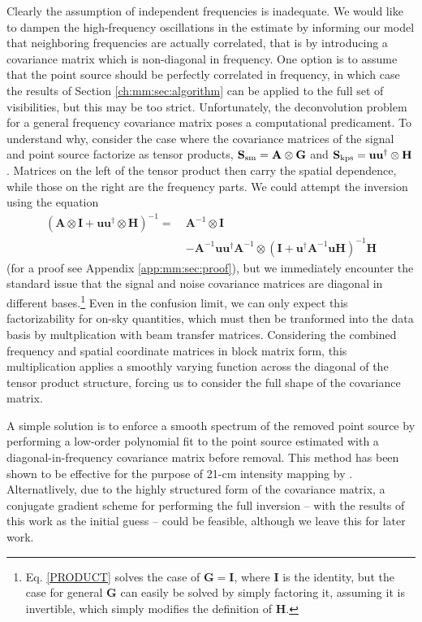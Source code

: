 Clearly the assumption of independent frequencies is inadequate. We would like to dampen the high-frequency oscillations in the estimate by informing our model that neighboring frequencies are actually correlated, that is by introducing a covariance matrix which is non-diagonal in frequency. One option is to assume that the point source should be perfectly correlated in frequency, in which case the results of Section \ref{ch:mm:sec:algorithm} can be applied to the full set of visibilities, but this may be too strict. Unfortunately, the deconvolution problem for a general frequency covariance matrix poses a computational predicament. To understand why, consider the case where the covariance matrices of the signal and point source factorize as tensor products, $\mathbf{S}_{\rm sm} = \mathbf{A} \otimes\mathbf{G}$ and $\mathbf{S}_{\rm kps} = \mathbf{u}\mathbf{u}^\dagger \otimes\mathbf{H}$. Matrices on the left of the tensor product then carry the spatial dependence, while those on the right are the frequency parts. We could attempt the inversion using the equation
\begin{align}
\left(\mathbf{A} \otimes \mathbf{I} + \mathbf{u}\mathbf{u}^\dagger \otimes \mathbf{H} \right)^{-1} = ~& \mathbf{A}^{-1} \otimes \mathbf{I} \label{PRODUCT}
\\ &- \mathbf{A}^{-1}\mathbf{u}\mathbf{u}^\dagger\mathbf{A}^{-1} \otimes \left(\mathbf{I} + \mathbf{u}^\dagger\mathbf{A}^{-1}\mathbf{u} \mathbf{H}\right)^{-1} \mathbf{H} \nonumber
\end{align}
(for a proof see Appendix \ref{app:mm:sec:proof}), but we immediately encounter the standard issue that the signal and noise covariance matrices are diagonal in different bases.\footnote{Eq. \eqref{PRODUCT} solves the case of $\mathbf{G}=\mathbf{I}$, where $\mathbf{I}$ is the identity, but the case for general $\mathbf{G}$ can easily be solved by simply factoring it, assuming it is invertible, which simply modifies the definition of $\mathbf{H}$.} Even in the confusion limit, we can only expect this factorizability for on-sky quantities, which must then be tranformed into the data basis by multplication with beam transfer matrices. Considering the combined frequency and spatial coordinate matrices in block matrix form, this multiplication applies a smoothly varying function across the diagonal of the tensor product structure, forcing us to consider the full shape of the covariance matrix.

A simple solution is to enforce a smooth spectrum of the removed point source by performing a low-order polynomial fit to the point source estimated with a diagonal-in-frequency covariance matrix before removal. This method has been shown to be effective for the purpose of 21-cm intensity mapping by \cite{barry2016}. Alternatlively, due to the highly structured form of the covariance matrix, a conjugate gradient scheme for performing the full inversion -- with the results of this work as the initial guess -- could be feasible, although we leave this for later work.

